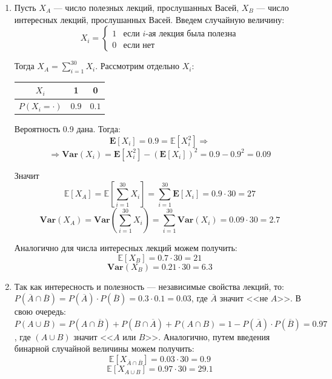 \documentclass[a4paper,12pt]{article}
\theoremstyle{plain}                         %
\theoremstyle{definition}                  %
\theoremstyle{remark}                      %
\begin{document}
\begin{enumerate}
\item Пусть $X_A$ --- число полезных лекций, прослушанных Васей,  $X_B$ --- число интересных лекций, прослушанных Васей. Введем случайную величину:
$$X_i =
\begin{cases}
1 & \text{если } i\text{-ая лекция была полезна}\\
0 & \text{если нет}
\end{cases}
$$

Тогда $X_A = \sum\limits_{i=1}^{30}X_i$. Рассмотрим отдельно $X_i$: \hspace{0.5cm}
\begin{minipage}{0.3\linewidth}

\begin{tabular}{c|c|c}
$X_i$ & 1 & 0 \\
\hline
$P(X_i = \cdot)$ & $0.9$ & $0.1$
\end{tabular}
\end{minipage}

Вероятность 0.9 дана. Тогда:
$$
\mathbf{E}[X_i] = 0.9 = \mathbb{E}[X^2_i] \Rightarrow 
$$
$$
\Rightarrow \mathbf{Var}(X_i) = \mathbf{E}[X^2_i] - (\mathbf{E}[X_i])^2 = 0.9 - 0.9^2 = 0.09
$$

Значит 
$$
\mathbb{E}[X_A] = \mathbb{E}\left[\sum\limits_{i=1}^{30}X_i\right] = \sum\limits_{i=1}^{30}\mathbf{E}[X_i]  = 0.9\cdot30 = 27
$$
$$
\mathbf{Var}(X_A) = \mathbf{Var}\left(\sum\limits_{i=1}^{30}X_i\right) = \sum\limits_{i=1}^{30}\mathbf{Var}(X_i) = 0.09\cdot30 = 2.7
$$

Аналогично для числа интересных лекций можем получить:
$$
\mathbb{E}[X_B] = 0.7\cdot 30 = 21
$$
$$
\mathbf{Var}(X_B) = 0.21\cdot 30 = 6.3
$$


\item Так как интересность и полезность --- независимые свойства лекций, то:\\
 $P(\overline{A} \cap \overline{B}) = P(\overline{A})\cdot P(\overline{B}) = 0.3\cdot0.1 = 0.03$, где $\overline{A}$ значит <<не $A$>>. В свою очередь:\\
 $P(A\cup B) = P(A\cap\overline{B}) + P(B\cap\overline{A}) + P(A\cap B) = 1 - P(\overline{A})\cdot P(\overline{B}) = 0.97$ , где $(A\cup B)$ значит <<$A$  или $B$>>. Аналогично, путем введения бинарной случайной величины можем получить:
 $$
 \mathbb{E}[X_{\overline{A} \cap \overline{B}}] = 0.03 \cdot  30 = 0.9
 $$
 $$
 \mathbb{E}[X_{A\cup B}] = 0.97\cdot30 = 29.1
$$


\end{enumerate}
\end{document}
